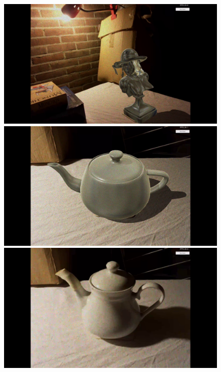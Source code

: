 \begin{figure}[H]
\begin{minipage}{0.5\textwidth}
    \end{minipage}\hfill
    \begin{minipage}{0.5\textwidth}
        \centering
        \includegraphics[width=0.99\textwidth]{Figures/Lena1.png} %
    \end{minipage}\hfill
        \begin{minipage}{0.5\textwidth}
        \centering
        \includegraphics[width=0.99\textwidth]{Figures/TeapotVirtual.png} %
    \end{minipage}\hfill
    \begin{minipage}{0.5\textwidth}
        \centering
        \includegraphics[width=0.99\textwidth]{Figures/TeapotReal.png} %
    \end{minipage}
\end{figure}